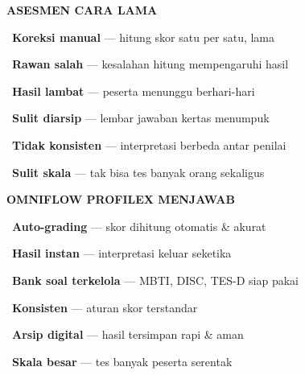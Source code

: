 \documentclass[a4paper]{article}
\begin{document}
\noindent
\begin{minipage}[t]{0.485\textwidth}
    \colorbox{RedLight}{%
        \begin{minipage}{\dimexpr\textwidth-2\fboxsep\relax}
            {\fontsize{10}{13}\selectfont\bfseries\color{RedText} ASESMEN CARA LAMA}
        \end{minipage}}\par
    \vspace{4pt}

    {\fontsize{9.5}{13}\selectfont\color{TextDark}%
    \textbullet\ \textbf{Koreksi manual} --- hitung skor satu per satu, lama\par\vspace{4pt}%
    \textbullet\ \textbf{Rawan salah} --- kesalahan hitung mempengaruhi hasil\par\vspace{4pt}%
    \textbullet\ \textbf{Hasil lambat} --- peserta menunggu berhari-hari\par\vspace{4pt}%
    \textbullet\ \textbf{Sulit diarsip} --- lembar jawaban kertas menumpuk\par\vspace{4pt}%
    \textbullet\ \textbf{Tidak konsisten} --- interpretasi berbeda antar penilai\par\vspace{4pt}%
    \textbullet\ \textbf{Sulit skala} --- tak bisa tes banyak orang sekaligus}%
\end{minipage}%
\hfill%
\begin{minipage}[t]{0.485\textwidth}
    \colorbox{BluePrimary}{%
        \begin{minipage}{\dimexpr\textwidth-2\fboxsep\relax}
            {\fontsize{10}{13}\selectfont\bfseries\color{White} OMNIFLOW PROFILEX MENJAWAB}
        \end{minipage}}\par
    \vspace{4pt}

    {\fontsize{9.5}{13}\selectfont\color{TextDark}%
    \textbullet\ \textbf{Auto-grading} --- skor dihitung otomatis \& akurat\par\vspace{4pt}%
    \textbullet\ \textbf{Hasil instan} --- interpretasi keluar seketika\par\vspace{4pt}%
    \textbullet\ \textbf{Bank soal terkelola} --- MBTI, DISC, TES-D siap pakai\par\vspace{4pt}%
    \textbullet\ \textbf{Konsisten} --- aturan skor terstandar\par\vspace{4pt}%
    \textbullet\ \textbf{Arsip digital} --- hasil tersimpan rapi \& aman\par\vspace{4pt}%
    \textbullet\ \textbf{Skala besar} --- tes banyak peserta serentak}%
\end{minipage}
\end{document}
